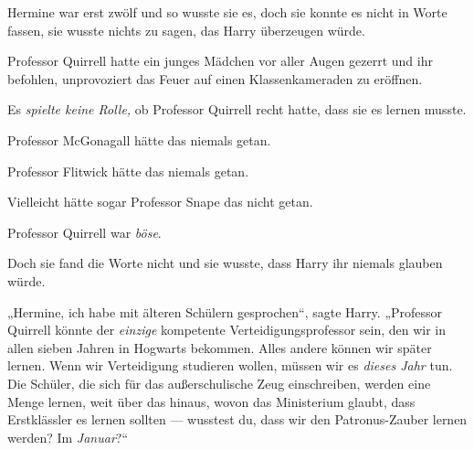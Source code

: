 Hermine war erst zwölf und so wusste sie es, doch sie konnte es nicht in Worte fassen, sie wusste nichts zu sagen, das Harry überzeugen würde.

Professor Quirrell hatte ein junges Mädchen vor aller Augen gezerrt und ihr befohlen, unprovoziert das Feuer auf einen Klassenkameraden zu eröffnen.

Es \emph{spielte keine Rolle,} ob Professor Quirrell recht hatte, dass sie es lernen musste.

Professor McGonagall hätte das niemals getan.

Professor Flitwick hätte das niemals getan.

Vielleicht hätte sogar Professor Snape das nicht getan.

Professor Quirrell war \emph{böse}.

Doch sie fand die Worte nicht und sie wusste, dass Harry ihr niemals glauben würde.

„Hermine, ich habe mit älteren Schülern gesprochen“, sagte Harry.
„Professor Quirrell könnte der \emph{einzige} kompetente Verteidigungsprofessor sein, den wir in allen sieben Jahren in Hogwarts bekommen. Alles andere können wir später lernen. Wenn wir Verteidigung studieren wollen, müssen wir es \emph{dieses Jahr} tun. Die Schüler, die sich für das außerschulische Zeug einschreiben, werden eine Menge lernen, weit über das hinaus, wovon das Ministerium glaubt, dass Erstklässler es lernen sollten — wusstest du, dass wir den Patronus-Zauber lernen werden? Im \emph{Januar}?“

